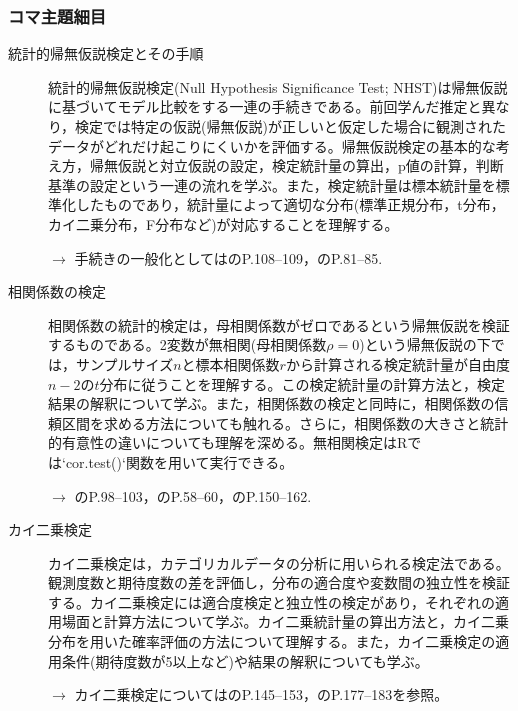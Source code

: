 \subsubsection{コマ主題細目}
\begin{description}
	\item[統計的帰無仮説検定とその手順] 統計的帰無仮説検定(Null Hypothesis Significance Test; NHST)は帰無仮説に基づいてモデル比較をする一連の手続きである。前回学んだ推定と異なり，検定では特定の仮説(帰無仮説)が正しいと仮定した場合に観測されたデータがどれだけ起こりにくいかを評価する。帰無仮説検定の基本的な考え方，帰無仮説と対立仮説の設定，検定統計量の算出，p値の計算，判断基準の設定という一連の流れを学ぶ。また，検定統計量は標本統計量を標準化したものであり，統計量によって適切な分布(標準正規分布，t分布，カイ二乗分布，F分布など)が対応することを理解する。
	      \begin{flushright}
		      $\to$ 手続きの一般化としては\textcite{Yamada2004}のP.108--109，\textcite{Kawabata201408}のP.81--85.
	      \end{flushright}

	\item[相関係数の検定] 相関係数の統計的検定は，母相関係数がゼロであるという帰無仮説を検証するものである。2変数が無相関(母相関係数$\rho=0$)という帰無仮説の下では，サンプルサイズ$n$と標本相関係数$r$から計算される検定統計量が自由度$n-2$の$t$分布に従うことを理解する。この検定統計量の計算方法と，検定結果の解釈について学ぶ。また，相関係数の検定と同時に，相関係数の信頼区間を求める方法についても触れる。さらに，相関係数の大きさと統計的有意性の違いについても理解を深める。無相関検定はRでは`cor.test()`関数を用いて実行できる。
	      \begin{flushright}
		      $\to$ \textcite{Kawabata201408}のP.98--103，\textcite{kosugi2018}のP.58--60，\textcite{Shimizu2021}のP.150--162.
	      \end{flushright}

	\item[カイ二乗検定] カイ二乗検定は，カテゴリカルデータの分析に用いられる検定法である。観測度数と期待度数の差を評価し，分布の適合度や変数間の独立性を検証する。カイ二乗検定には適合度検定と独立性の検定があり，それぞれの適用場面と計算方法について学ぶ。カイ二乗統計量の算出方法と，カイ二乗分布を用いた確率評価の方法について理解する。また，カイ二乗検定の適用条件(期待度数が5以上など)や結果の解釈についても学ぶ。
	      \begin{flushright}
		      $\to$ カイ二乗検定については\textcite{Kawabata201408}のP.145--153，\textcite{Yamada2004}のP.177--183を参照。
	      \end{flushright}


\end{description}

